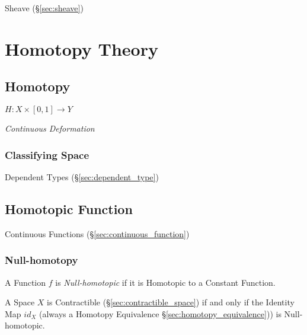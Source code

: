 Sheave (\S\ref{sec:sheave})



\section{Homotopy Theory}\label{sec:homotopy_theory}

\subsection{Homotopy}\label{sec:homotopy}

$H : X \times [0,1] \rightarrow Y$

\emph{Continuous Deformation}



\subsubsection{Classifying Space}\label{sec:classifying_space}

Dependent Types (\S\ref{sec:dependent_type})



\subsection{Homotopic Function}\label{sec:homotopic_function}

Continuous Functions (\S\ref{sec:continuous_function})



\subsubsection{Null-homotopy}\label{sec:null_homotopy}

A Function $f$ is \emph{Null-homotopic} if it is Homotopic to a
Constant Function.

A Space $X$ is Contractible (\S\ref{sec:contractible_space}) if and
only if the Identity Map $id_X$ (always a Homotopy Equivalence
\S\ref{sec:homotopy_equivalence})) is Null-homotopic.



